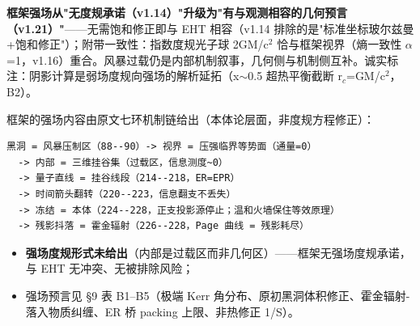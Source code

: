 \documentclass[UTF8,fontset=windows]{csoarticle}
\newcommand{\up}[1]{\ensuremath{^{#1}}}
\newcommand{\down}[1]{\ensuremath{_{#1}}}
\begin{document}
\textbf{框架强场从"无度规承诺（v1.14）"升级为"有与观测相容的几何预言（v1.21）"}------无需饱和修正即与 EHT 相容（v1.14 排除的是"标准坐标玻尔兹曼+饱和修正"）；附带一致性：指数度规光子球 2GM/c\up{2} 恰与框架视界（熵一致性 \ensuremath{\alpha}=1，v1.16）重合。风暴过载仍是内部机制叙事，几何侧与机制侧互补。诚实标注：阴影计算是弱场度规向强场的解析延拓（x\ensuremath{\sim}0.5 超热平衡截断 r\down{c}=GM/c\up{2}，B2）。

框架的强场内容由原文七环机制链给出（本体论层面，非度规方程修正）：

\begin{verbatim}
黑洞 = 风暴压制区（88--90）-> 视界 = 压强临界等势面（通量=0）
  -> 内部 = 三维挂谷集（过载区，信息测度~0）
  -> 量子直线 = 挂谷线段（214--218，ER=EPR）
  -> 时间箭头翻转（220--223，信息翻支不丢失）
  -> 冻结 = 本体（224--228，正支投影源停止；温和火墙保住等效原理）
  -> 残影抖落 = 霍金辐射（226--228，Page 曲线 = 残影耗尽）
\end{verbatim}

\begin{itemize}
\item \textbf{强场度规形式未给出}（内部是过载区而非几何区）------框架无强场度规承诺，与 EHT 无冲突、无被排除风险；
\item 强场预言见 \S{}9 表 B1--B5（极端 Kerr 角分布、原初黑洞体积修正、霍金辐射-落入物质纠缠、ER 桥 packing 上限、非热修正 1/S）。
\end{itemize}
\end{document}
